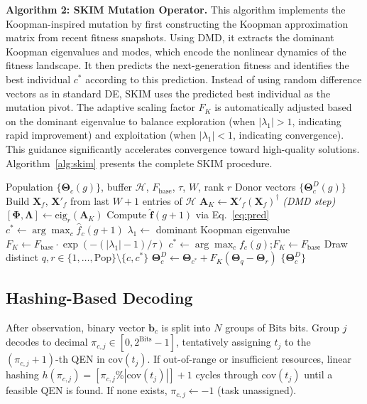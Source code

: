 \documentclass[10pt,twocolumn]{article}
\begin{document}
\textbf{Algorithm 2: SKIM Mutation Operator.}
This algorithm implements the Koopman-inspired mutation by first constructing the Koopman approximation matrix from recent fitness snapshots. Using DMD, it extracts the dominant Koopman eigenvalues and modes, which encode the nonlinear dynamics of the fitness landscape. It then predicts the next-generation fitness and identifies the best individual $c^*$ according to this prediction. Instead of using random difference vectors as in standard DE, SKIM uses the predicted best individual as the mutation pivot. The adaptive scaling factor $F_K$ is automatically adjusted based on the dominant eigenvalue to balance exploration (when $|\lambda_1|>1$, indicating rapid improvement) and exploitation (when $|\lambda_1|<1$, indicating convergence). This guidance significantly accelerates convergence toward high-quality solutions. Algorithm~\ref{alg:skim} presents the complete SKIM procedure.

\begin{algorithm}[t]
\caption{SKIM Mutation Operator}
\label{alg:skim}
\small
\begin{algorithmic}[1]
\REQUIRE Population $\{\boldsymbol{\Theta}_c(g)\}$, buffer $\mathcal{H}$, $F_{\mathrm{base}}$, $\tau$, $W$, rank $r$
\ENSURE Donor vectors $\{\boldsymbol{\Theta}^D_c(g)\}$
    \STATE Build $\mathbf{X}_f$, $\mathbf{X}'_f$ from last $W{+}1$ entries of $\mathcal{H}$
    \STATE $\mathbf{A}_K\leftarrow\mathbf{X}'_f(\mathbf{X}_f)^\dagger$ \hfill\textit{(DMD step)}
    \STATE $[\boldsymbol{\Phi},\boldsymbol{\Lambda}]\leftarrow\mathrm{eig}_r(\mathbf{A}_K)$
    \STATE Compute $\hat{\mathbf{f}}(g{+}1)$ via Eq.~\eqref{eq:pred}
    \STATE $c^*\leftarrow\arg\max_c\hat{f}_c(g{+}1)$
    \STATE $\lambda_1\leftarrow$ dominant Koopman eigenvalue
    \STATE $F_K\leftarrow F_{\mathrm{base}}\cdot\exp(-(|\lambda_1|-1)/\tau)$
\ELSE
    \STATE $c^*\leftarrow\arg\max_c f_c(g)$;\quad $F_K\leftarrow F_{\mathrm{base}}$
\ENDIF
{}
    \STATE Draw distinct $q,r\in\{1,\ldots,\mathrm{Pop}\}\setminus\{c,c^*\}$
    \STATE $\boldsymbol{\Theta}^D_c\leftarrow\boldsymbol{\Theta}_{c^*}+F_K(\boldsymbol{\Theta}_q-\boldsymbol{\Theta}_r)$
\ENDFOR
\RETURN $\{\boldsymbol{\Theta}^D_c\}$
\end{algorithmic}
\end{algorithm}

\subsection{Hashing-Based Decoding}
After observation, binary vector $\mathbf{b}_c$ is split into $N$ groups of $\mathrm{Bits}$ bits. Group $j$ decodes to decimal $\pi_{c,j}\in[0,2^{\mathrm{Bits}}{-}1]$, tentatively assigning $t_j$ to the $(\pi_{c,j}{+}1)$-th QEN in $\mathrm{cov}(t_j)$. If out-of-range or insufficient resources, linear hashing $h(\pi_{c,j})=[\pi_{c,j}\%|\mathrm{cov}(t_j)|]+1$ cycles through $\mathrm{cov}(t_j)$ until a feasible QEN is found. If none exists, $\pi_{c,j}\leftarrow-1$ (task unassigned).
\end{document}
